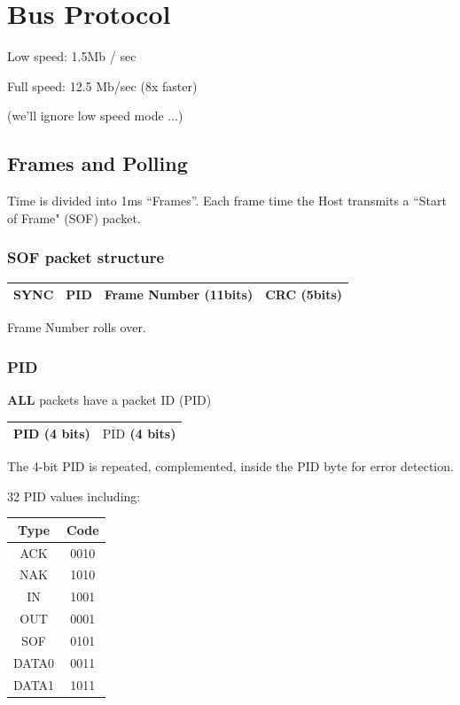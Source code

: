 \section{Bus Protocol}
Low speed: 1.5Mb / sec

Full speed: 12.5 Mb/sec (8x faster)

(we'll ignore low speed mode ...)
\subsection{Frames and Polling}
Time is divided into 1ms ``Frames''.
Each frame time the Host transmits a ``Start of Frame"
(SOF)  packet.

\subsubsection{SOF packet structure}

\begin{tabular}{|c|c|c|c|}
\hline
SYNC  & PID & Frame Number (11bits) & CRC (5bits) \\
\hline
\end{tabular}

Frame Number rolls over.

\subsubsection{PID}
{\bf ALL} packets have a packet ID (PID)


\begin{tabular}{|c|c| }
\hline
PID (4 bits) & $\overline{\mathrm {PID}}$ (4 bits)\\
\hline
\end{tabular}


The 4-bit PID is repeated, complemented, inside the PID
byte for error detection.

32 PID values including: \hspace{0.25in}
\begin{tabular}{|c|c|}
\hline
Type	& Code \\ \hline
ACK	& 0010 \\ \hline
NAK	& 1010 \\ \hline
IN	& 1001 \\ \hline
OUT	& 0001 \\ \hline
SOF	& 0101 \\ \hline
DATA0	& 0011 \\ \hline
DATA1	& 1011 \\ \hline
\end{tabular}

